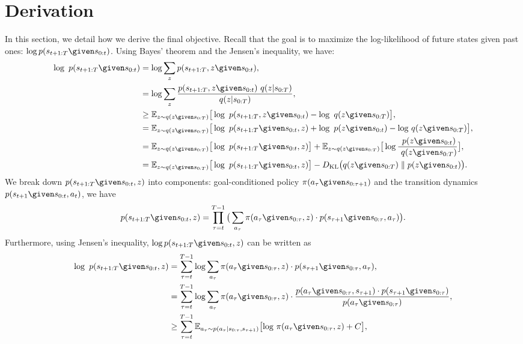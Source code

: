 \documentclass[11pt, a4paper, logo, one column]{craftjarvis}
\begin{document}
\section{Derivation}  \label{appendix:derivation}
In this section, we detail how we derive the final objective. Recall that the goal is to maximize the log-likelihood of future states given past ones: $\log p(s_{t+1:T} \given s_{0:t})$. Using Bayes' theorem and the Jensen's inequality, we have:
\begin{align} \label{eq:to_be_proved}
    \log\ p(s_{t+1:T} \given s_{0:t}) &= \log \sum_{z} p(s_{t+1:T}, z \given s_{0:t}), \\ 
    &= \log \sum_{z} \frac{p(s_{t+1:T}, z  \given s_{0:t})\ q(z|s_{0:T})}{q(z|s_{0:T})}, \\ 
    &\ge \mathbb{E}_{z\sim q(z \given s_{0:T})} \big[ \log\ p(s_{t+1:T}, z \given s_{0:t}) - \log\ q(z \given s_{0:T})\big], \\
    &= \mathbb{E}_{z\sim q(z \given s_{0:T})} \big[ \log\ p(s_{t+1:T} \given s_{0:t}, z)+\log\ p(z \given s_{0:t}) - \text{log}\ q(z \given s_{0:T})\big], \\
    &= \mathbb{E}_{z\sim q(z \given s_{0:T})} \big[ \log\ p(s_{t+1:T} \given s_{0:t}, z) \big] + \mathbb{E}_{z\sim q(z \given s_{0:T})} \big[\log \frac{\ p(z \given s_{0:t})}{\ q(z \given s_{0:T})} \big], \\
    &=\mathbb{E}_{z\sim q(z \given s_{0:T})} \big[ \log\ p(s_{t+1:T} \given s_{0:t}, z) \big] - D_{\text{KL}}\big( q(z \given s_{0:T}) \parallel p(z \given s_{0:t}) \big).  
\end{align}
We break down $p(s_{t+1:T} \given s_{0:t}, z)$ into components: goal-conditioned policy $\pi(a_{\tau} \given s_{0:\tau+1})$ and the transition dynamics $p(s_{t+1} \given s_{0:t}, a_t)$, we have 
\begin{align}
    p(s_{t+1:T} \given s_{0:t}, z) = \prod_{\tau=t}^{T-1}\big(\sum_{a_{\tau}} \pi(a_{\tau} \given s_{0:\tau}, z)\cdot p(s_{\tau+1} \given s_{0:\tau}, a_{\tau})\big). 
\end{align}
Furthermore, using Jensen's inequality, $\log p(s_{t+1:T} \given s_{0:t}, z)$ can be written as
\begin{align}
    \log\ p(s_{t+1:T} \given s_{0:t}, z) &=\sum_{\tau=t}^{T-1} \log \sum_{a_{\tau}} \pi(a_{\tau} \given s_{0:\tau}, z)\cdot p(s_{\tau+1} \given s_{0:\tau}, a_{\tau}), \\
    &= \sum_{\tau=t}^{T-1} \log \sum_{a_{\tau}} \pi(a_{\tau} \given s_{0:\tau}, z)\cdot \frac{p(a_{\tau} \given s_{0:\tau}, s_{\tau+1})\cdot p(s_{\tau+1} \given s_{0:\tau})}{p(a_{\tau} \given s_{0:\tau})}, \\
    &\ge \sum_{\tau=t}^{T-1}\mathbb{E}_{a_\tau\sim p(a_{\tau}|s_{0:\tau}, s_{\tau+1})} \big[ \text{log}\ \pi(a_{\tau} \given s_{0:\tau}, z) + C\big], 
\end{align}
\end{document}
